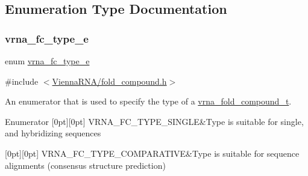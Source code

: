 \subsection{Enumeration Type Documentation}
\mbox{\label{group__fold__compound_ga01a4ff86fa71deaaa5d1abbd95a1447d}} 
\subsubsection{\texorpdfstring{vrna\_fc\_type\_e}{vrna\_fc\_type\_e}}
{\footnotesize\ttfamily enum \mbox{\hyperlink{group__fold__compound_ga01a4ff86fa71deaaa5d1abbd95a1447d}{vrna\+\_\+fc\+\_\+type\+\_\+e}}}



{\ttfamily \#include $<$\mbox{\hyperlink{fold__compound_8h}{Vienna\+R\+N\+A/fold\+\_\+compound.\+h}}$>$}



An enumerator that is used to specify the type of a \mbox{\hyperlink{group__fold__compound_ga1b0cef17fd40466cef5968eaeeff6166}{vrna\+\_\+fold\+\_\+compound\+\_\+t}}. 

\begin{DoxyEnumFields}{Enumerator}
[0pt][0pt]{}\mbox{\label{group__fold__compound_gga01a4ff86fa71deaaa5d1abbd95a1447da7e264dd3cf2dc9b6448caabcb7763cd6}} 
V\+R\+N\+A\+\_\+\+F\+C\+\_\+\+T\+Y\+P\+E\+\_\+\+S\+I\+N\+G\+LE&Type is suitable for single, and hybridizing sequences \\
\hline

[0pt][0pt]{}\mbox{\label{group__fold__compound_gga01a4ff86fa71deaaa5d1abbd95a1447dab821ce46ea3cf665be97df22a76f5023}} 
V\+R\+N\+A\+\_\+\+F\+C\+\_\+\+T\+Y\+P\+E\+\_\+\+C\+O\+M\+P\+A\+R\+A\+T\+I\+VE&Type is suitable for sequence alignments (consensus structure prediction) \\
\hline

\end{DoxyEnumFields}


